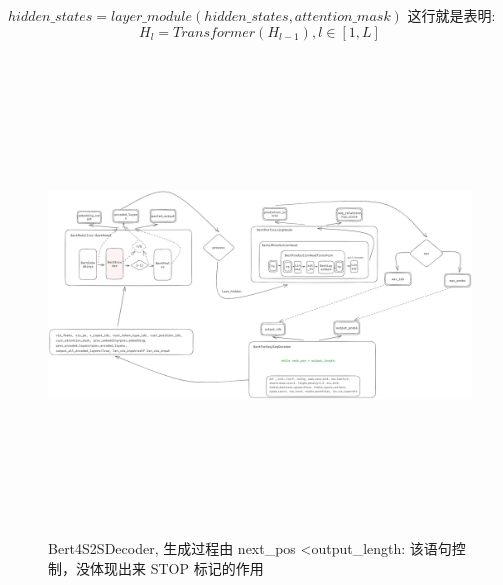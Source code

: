 \documentclass[a4paper]{article}
\begin{document}
\begin{sloppypar}
      $hidden\_states = layer\_module(hidden\_states, attention\_mask)$ 这行就是表明:
      $$
            H_l = Transformer(H_{l - 1}),l \in [1,L]
      $$
      \begin{figure}[H]
            \centering
            \includegraphics[width=6.5in,height=5.0in]{Bert4S2SDecoder.png}

            \caption{Bert4S2SDecoder, 生成过程由 next\_pos \textless output\_length: 该语句控制，没体现出来 STOP 标记的作用}

            \label{Bert4S2SDecoder}
      \end{figure}







\end{sloppypar}
\end{document}
